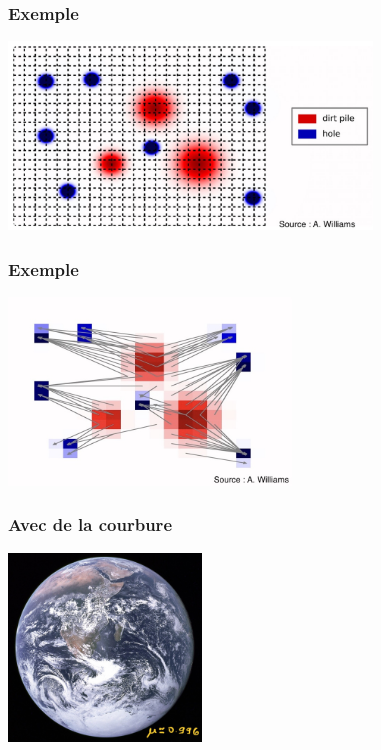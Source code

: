 \documentclass[9pt]{beamer}
\begin{document}
\begin{frame}
\frametitle{\bf Exemple}
 
\centering \includegraphics[height=5.0cm]{ex2}

\end{frame}

\begin{frame}
\frametitle{\bf Exemple}
 
\centering \includegraphics[height=5.0cm]{ex3}

\end{frame}

\begin{frame}
\frametitle{\bf Avec de la courbure}
 
\centering \includegraphics[height=5.0cm]{terre}

\end{frame}
\end{document}
